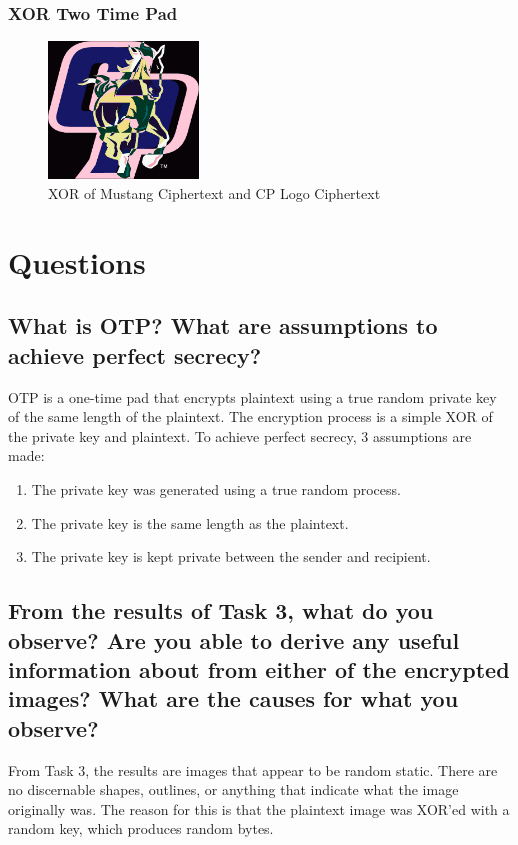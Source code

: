 \documentclass[11pt]{article}
\begin{document}
    \subsubsection{XOR Two Time Pad}
      \begin{figure}[ht!p]
        \centering
        \includegraphics[width=4cm]{Images/xor.jpg}
        \caption{XOR of Mustang Ciphertext and CP Logo Ciphertext}
        \label{fig:2_Time_Pad}
      \end{figure}

\section{Questions}

  \subsection{What is OTP? What are assumptions to achieve perfect secrecy?}
  OTP is a one-time pad that encrypts plaintext using a true random private 
  key of the same length of the plaintext.
  The encryption process is a simple XOR of the private key and plaintext.
  To achieve perfect secrecy, 3 assumptions are made: 
  \begin{enumerate}
    \item The private key was generated using a true random process. 
    \item The private key is the same length as the plaintext. 
    \item The private key is kept private between the sender and recipient.
  \end{enumerate}

  \subsection{From the results of Task 3, what do you observe? Are you able to derive any 
  useful information about from either of the encrypted images? What are the 
  causes for what you observe?}
  From Task 3, the results are images that appear to be random static.
  There are no discernable shapes, outlines, or anything that indicate what the 
  image originally was. The reason for this is that the plaintext image was
  XOR'ed with a random key, which produces random bytes.
\end{document}
